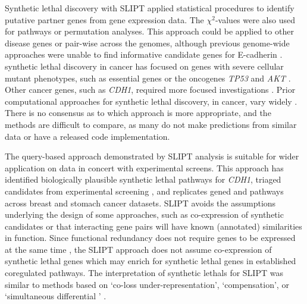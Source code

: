 Synthetic lethal discovery  with \gls{SLIPT} applied statistical procedures to identify putative partner genes from \gls{gene expression} data. The $\chi^2$-values were also used for \glspl{pathway} or permutation analyses. This approach could be applied to other disease genes or pair-wise across the \glspl{genome}, although previous \gls{genome}-wide approaches were unable to find informative candidate genes for \gls{E-cadherin} \citep{Lu2015}. \Gls{synthetic lethal} discovery in cancer has focused on genes with severe cellular \gls{mutant} phenotypes, such as \gls{essential} genes or the \glspl{oncogene} \textit{TP53} and \textit{AKT} \citep{Tiong2014, Lu2015, Wang2013}. Other cancer genes, such as \textit{CDH1}, required more focused investigations \citep{Srihari2015, Telford2015}. Prior computational approaches for \gls{synthetic lethal} discovery, in cancer, vary widely \citep{Tiong2014, Jerby2014, Lu2015, Wappett2016}. There is no consensus as to which approach is more appropriate, and the methods are difficult to compare, as many do not make predictions from similar data or have a released code implementation.

The query-based approach demonstrated by \gls{SLIPT} analysis is suitable for wider application on  data in concert with experimental screens. This approach has identified biologically plausible \gls{synthetic lethal} \glspl{pathway} for \textit{CDH1}, triaged candidates from experimental screening \citep{Telford2015}, and replicates gened and \glspl{pathway} across breast and stomach cancer datasets. \gls{SLIPT} avoids the assumptions underlying the design of some approaches, such as co-expression of synthetic candidates or that interacting gene pairs will have known (annotated) similarities in function. 
%
Since \gls{functional redundancy} does not require genes to be expressed at the same time \citep{Lu2015}, the \gls{SLIPT} approach does not assume co-expression of \gls{synthetic lethal} genes which may enrich for \gls{synthetic lethal} genes in established coregulated \glspl{pathway}. The interpretation of \glspl{synthetic lethal} for \gls{SLIPT} was similar to methods based on `co-loss under-represent\-at\-ion', `compensation', or `simultaneous differential ' \citep{Tiong2014, Lu2015, Wang2013}.

